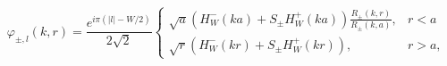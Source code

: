 \begin{equation}
\label{Eq_0211}
\varphi_{\pm, l}(k,r) = 
\frac{e^{i\pi(|l| - W/2)}}{2\sqrt{2}}
\begin{cases}
\displaystyle
\sqrt{a} \left( H^{-}_{W} (ka) + S_{\pm} H^{+}_{W} (ka) \right)
  \frac{R_{\pm}(k,r)}{R_{\pm} (k,a)}, & r < a	\\[3mm]
\displaystyle
\sqrt{r} \left( H^{-}_{W} (kr) + S_{\pm} H^{+}_{W} (kr) \right), 
  & r > a,
\end{cases}
\end{equation}

